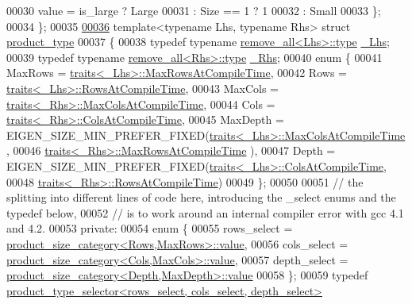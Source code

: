 \begin{DoxyCode}
00030          value = is\_large  ? Large
00031                : Size == 1 ? 1
00032                            : Small
00033   \};
00034 \};
00035 
\hyperlink{struct_eigen_1_1internal_1_1product__type}{00036} \textcolor{keyword}{template}<\textcolor{keyword}{typename} Lhs, \textcolor{keyword}{typename} Rhs> \textcolor{keyword}{struct }\hyperlink{struct_eigen_1_1internal_1_1product__type}{product\_type}
00037 \{
00038   \textcolor{keyword}{typedef} \textcolor{keyword}{typename} \hyperlink{group___sparse_core___module}{remove\_all<Lhs>::type} \hyperlink{group___sparse_core___module}{\_Lhs};
00039   \textcolor{keyword}{typedef} \textcolor{keyword}{typename} \hyperlink{group___sparse_core___module}{remove\_all<Rhs>::type} \hyperlink{group___sparse_core___module}{\_Rhs};
00040   \textcolor{keyword}{enum} \{
00041     MaxRows = \hyperlink{struct_eigen_1_1internal_1_1traits}{traits<\_Lhs>::MaxRowsAtCompileTime},
00042     Rows    = \hyperlink{struct_eigen_1_1internal_1_1traits}{traits<\_Lhs>::RowsAtCompileTime},
00043     MaxCols = \hyperlink{struct_eigen_1_1internal_1_1traits}{traits<\_Rhs>::MaxColsAtCompileTime},
00044     Cols    = \hyperlink{struct_eigen_1_1internal_1_1traits}{traits<\_Rhs>::ColsAtCompileTime},
00045     MaxDepth = EIGEN\_SIZE\_MIN\_PREFER\_FIXED(\hyperlink{struct_eigen_1_1internal_1_1traits}{traits<\_Lhs>::MaxColsAtCompileTime}
      ,
00046                                            \hyperlink{struct_eigen_1_1internal_1_1traits}{traits<\_Rhs>::MaxRowsAtCompileTime}
      ),
00047     Depth = EIGEN\_SIZE\_MIN\_PREFER\_FIXED(\hyperlink{struct_eigen_1_1internal_1_1traits}{traits<\_Lhs>::ColsAtCompileTime},
00048                                         \hyperlink{struct_eigen_1_1internal_1_1traits}{traits<\_Rhs>::RowsAtCompileTime})
00049   \};
00050 
00051   \textcolor{comment}{// the splitting into different lines of code here, introducing the \_select enums and the typedef below,}
00052   \textcolor{comment}{// is to work around an internal compiler error with gcc 4.1 and 4.2.}
00053 \textcolor{keyword}{private}:
00054   \textcolor{keyword}{enum} \{
00055     rows\_select = \hyperlink{struct_eigen_1_1internal_1_1product__size__category}{product\_size\_category<Rows,MaxRows>::value},
00056     cols\_select = \hyperlink{struct_eigen_1_1internal_1_1product__size__category}{product\_size\_category<Cols,MaxCols>::value},
00057     depth\_select = \hyperlink{struct_eigen_1_1internal_1_1product__size__category}{product\_size\_category<Depth,MaxDepth>::value}
00058   \};
00059   \textcolor{keyword}{typedef} \hyperlink{struct_eigen_1_1internal_1_1product__type__selector}{product\_type\_selector<rows\_select, cols\_select, depth\_select>}

\end{DoxyCode}
